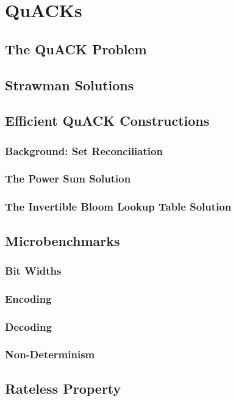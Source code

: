 \chapter{QuACKs}
\section{The QuACK Problem}
\section{Strawman Solutions}

\section{Efficient QuACK Constructions}
\subsection{Background: Set Reconciliation}
\subsection{The Power Sum Solution}
\subsection{The Invertible Bloom Lookup Table Solution}
\section{Microbenchmarks}
\subsection{Bit Widths}
\subsection{Encoding}
\subsection{Decoding}
\subsection{Non-Determinism}
\section{Rateless Property}